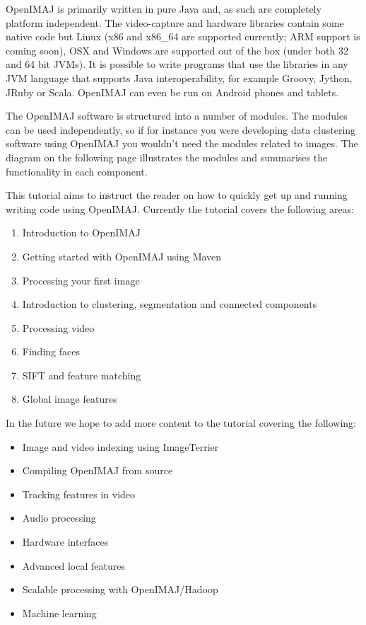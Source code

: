 \documentclass[10pt,a4paper,twoside,extrafontsizes]{memoir}
\begin{document}
OpenIMAJ is primarily written in pure Java and, as such are completely platform 
independent. The video-capture and hardware libraries contain some native code 
but Linux (x86 and x86\_64 are supported currently; ARM support is coming soon), 
OSX and Windows are supported out of the box (under both 32 and 64 bit JVMs). 
It is possible to write programs that use the libraries in any JVM language 
that supports Java interoperability, for example Groovy, Jython, JRuby or 
Scala. OpenIMAJ can even be run on Android phones and tablets.

The OpenIMAJ software is structured into a number of modules. The modules 
can be used independently, so if for instance you were developing data 
clustering software using OpenIMAJ you wouldn't need the modules related 
to images. The diagram on the following page illustrates the modules 
and summarises the functionality in each component.

This tutorial aims to instruct the reader on how to quickly get up and running
writing code using OpenIMAJ. Currently the tutorial covers the following areas:
\begin{enumerate}
	\item Introduction to OpenIMAJ
	\item Getting started with OpenIMAJ using Maven
	\item Processing your first image
	\item Introduction to clustering, segmentation and connected components
	\item Processing video
	\item Finding faces
	\item SIFT and feature matching
	\item Global image features
\end{enumerate}

In the future we hope to add more content to the tutorial covering the following:
\begin{itemize}
	\item Image and video indexing using ImageTerrier
	\item Compiling OpenIMAJ from source
	\item Tracking features in video
	\item Audio processing
	\item Hardware interfaces
	\item Advanced local features
	\item Scalable processing with OpenIMAJ/Hadoop
	\item Machine learning
\end{itemize}
\end{document}
